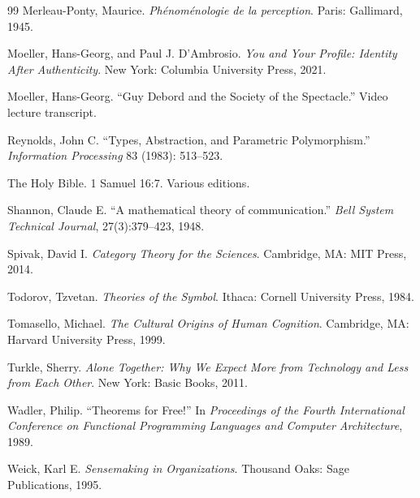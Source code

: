 \documentclass[11pt]{article}
\begin{document}
\begin{thebibliography}{99}
Merleau-Ponty, Maurice.
\textit{Phénoménologie de la perception}.
Paris: Gallimard, 1945.

Moeller, Hans-Georg, and Paul J. D’Ambrosio.
\textit{You and Your Profile: Identity After Authenticity}.
New York: Columbia University Press, 2021.

Moeller, Hans-Georg.
“Guy Debord and the Society of the Spectacle.”
Video lecture transcript.

Reynolds, John C.
“Types, Abstraction, and Parametric Polymorphism.”
\textit{Information Processing} 83 (1983): 513–523.

The Holy Bible.
1 Samuel 16:7.
Various editions.

Shannon, Claude E.
“A mathematical theory of communication.”
\textit{Bell System Technical Journal}, 27(3):379–423, 1948.

Spivak, David I.
\textit{Category Theory for the Sciences}.
Cambridge, MA: MIT Press, 2014.

Todorov, Tzvetan.
\textit{Theories of the Symbol}.
Ithaca: Cornell University Press, 1984.

Tomasello, Michael.
\textit{The Cultural Origins of Human Cognition}.
Cambridge, MA: Harvard University Press, 1999.

Turkle, Sherry.
\textit{Alone Together: Why We Expect More from Technology and Less from Each Other}.
New York: Basic Books, 2011.

Wadler, Philip.
“Theorems for Free!”
In \textit{Proceedings of the Fourth International Conference on Functional Programming Languages and Computer Architecture}, 1989.

Weick, Karl E.
\textit{Sensemaking in Organizations}.
Thousand Oaks: Sage Publications, 1995.

\end{thebibliography}
\end{document}
